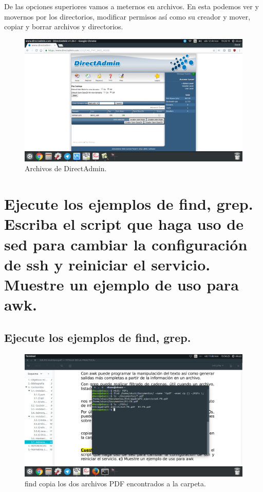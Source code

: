 \begin{flushleft}
De las opciones superiores vamos a meternos en archivos. En esta podemos ver y movernos por los directorios, modificar permisos así como su creador y mover, copiar y borrar archivos y directorios.

\begin{figure}[H]
	\centering
	\includegraphics[scale=0.3]{directadmin3.png}
	\caption{Archivos de DirectAdmin.}
\end{figure}


\section{Ejecute los ejemplos de find, grep. Escriba el script que haga uso de sed para cambiar la configuración de ssh y reiniciar el servicio. Muestre un ejemplo de uso para awk.}

\subsection{Ejecute los ejemplos de find, grep.}
\begin{figure}[H]
	\centering
	\includegraphics[scale=0.3]{find.png}
	\caption{find copia los dos archivos PDF encontrados a la carpeta.}
\end{figure}


\end{flushleft}
